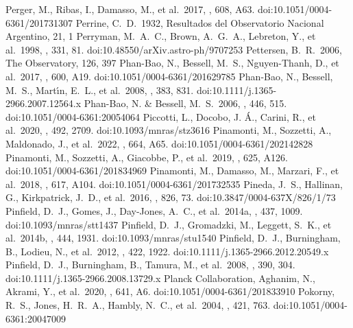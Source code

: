 \documentclass[twocolumn,tighten,twocolappendix]{aastex631}
\begin{document}
\begin{thebibliography}{}
 Perger, M., Ribas, I., Damasso, M., et al.\ 2017, \aap, 608, A63. doi:10.1051/0004-6361/201731307
 Perrine, C.~D.\ 1932, Resultados del Observatorio Nacional Argentino, 21, 1
 Perryman, M.~A.~C., Brown, A.~G.~A., Lebreton, Y., et al.\ 1998, \aap, 331, 81. doi:10.48550/arXiv.astro-ph/9707253
 Pettersen, B.~R.\ 2006, The Observatory, 126, 397
 Phan-Bao, N., Bessell, M.~S., Nguyen-Thanh, D., et al.\ 2017, \aap, 600, A19. doi:10.1051/0004-6361/201629785
 Phan-Bao, N., Bessell, M.~S., Mart{\'\i}n, E.~L., et al.\ 2008, \mnras, 383, 831. doi:10.1111/j.1365-2966.2007.12564.x
 Phan-Bao, N. \& Bessell, M.~S.\ 2006, \aap, 446, 515. doi:10.1051/0004-6361:20054064
 Piccotti, L., Docobo, J. {\'A}., Carini, R., et al.\ 2020, \mnras, 492, 2709. doi:10.1093/mnras/stz3616
 Pinamonti, M., Sozzetti, A., Maldonado, J., et al.\ 2022, \aap, 664, A65. doi:10.1051/0004-6361/202142828
 Pinamonti, M., Sozzetti, A., Giacobbe, P., et al.\ 2019, \aap, 625, A126. doi:10.1051/0004-6361/201834969
 Pinamonti, M., Damasso, M., Marzari, F., et al.\ 2018, \aap, 617, A104. doi:10.1051/0004-6361/201732535
 Pineda, J.~S., Hallinan, G., Kirkpatrick, J.~D., et al.\ 2016, \apj, 826, 73. doi:10.3847/0004-637X/826/1/73
 Pinfield, D.~J., Gomes, J., Day-Jones, A.~C., et al.\ 2014a, \mnras, 437, 1009. doi:10.1093/mnras/stt1437
 Pinfield, D.~J., Gromadzki, M., Leggett, S.~K., et al.\ 2014b, \mnras, 444, 1931. doi:10.1093/mnras/stu1540
 Pinfield, D.~J., Burningham, B., Lodieu, N., et al.\ 2012, \mnras, 422, 1922. doi:10.1111/j.1365-2966.2012.20549.x
 Pinfield, D.~J., Burningham, B., Tamura, M., et al.\ 2008, \mnras, 390, 304. doi:10.1111/j.1365-2966.2008.13729.x
 Planck Collaboration, Aghanim, N., Akrami, Y., et al.\ 2020, \aap, 641, A6. doi:10.1051/0004-6361/201833910
 Pokorny, R.~S., Jones, H.~R.~A., Hambly, N.~C., et al.\ 2004, \aap, 421, 763. doi:10.1051/0004-6361:20047009

\end{thebibliography}
\end{document}
